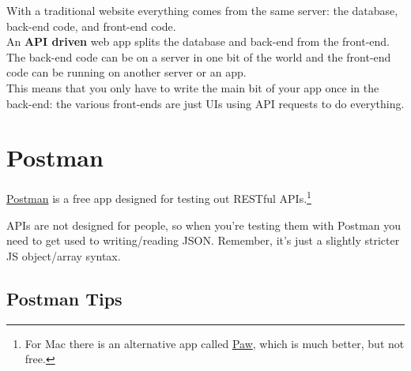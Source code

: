 With a traditional website everything comes from the same server: the database, back-end code, and front-end code.
\\

An \textbf{API driven} web app splits the database and back-end from the front-end. The back-end code can be on a server in one bit of the world and the front-end code can be running on another server or an app.
\\

This means that you only have to write the main bit of your app once in the back-end: the various front-ends are just UIs using API requests to do everything.
\\



\pagebreak

\section{Postman}

\href{https://www.getpostman.com}{Postman} is a free app designed for testing out RESTful APIs.\footnote{For Mac there is an alternative app called \href{https://paw.cloud}{Paw}, which is much better, but not free.}


APIs are not designed for people, so when you're testing them with Postman you need to get used to writing/reading JSON. Remember, it's just a slightly stricter JS object/array syntax.

\subsection{Postman Tips}


